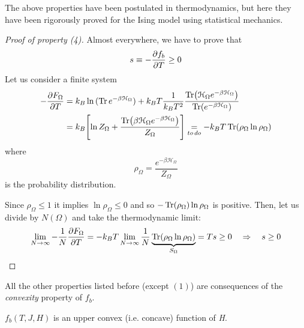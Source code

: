 \documentclass[../main/main.tex]{subfiles}
\begin{document}
\begin{remark}
The above properties have been postulated in thermodynamics, but here they have been rigorously proved for the Ising model using statistical mechanics.
\end{remark}
\begin{proof} [Proof of property (4)]
  Almost everywhere, we have to prove that
  \begin{equation*}
    s \equiv - \pdv{f_b}{T} \ge 0
  \end{equation*}
  Let us consider a finite system
  \begin{equation*}
  \begin{split}
  - \pdv{F_ \Omega }{T}   &= k_B \ln{(\Tr e^{- \beta \mathcal{H}_ \Omega }  )} + k_B T \frac{1}{k_B T^2} \frac{\Tr(\mathcal{H}_ \Omega  e^{-\beta \mathcal{H}_ \Omega } ) }{\Tr(e^{- \beta \mathcal{H}_ \Omega } ) } \\
  &= k_B \qty[\ln{Z_\Omega} + \frac{\Tr(\beta \mathcal{H}_ \Omega e^{-\beta \mathcal{H}_ \Omega
  } ) }{Z_ \Omega } ] \underset{to\, do}{=}   - k_B T \Tr(\rho _ \Omega  \ln{\rho _ \Omega } )
  \end{split}
  \end{equation*}
  where
  \begin{equation*}
    \rho _ \Omega  = \frac{e^{-\beta \mathcal{H}_ \Omega } }{Z_ \Omega  }
  \end{equation*}
  is the probability distribution.

  Since \( \rho _ \Omega \le 1 \) it implies \( \ln{\rho _ \Omega } \le 0  \) and so \( - \Tr(\rho _ \Omega ) \ln{\rho _ \Omega }   \) is positive. Then, let us divide by \( N (\Omega ) \) and take the thermodynamic limit:
  \begin{equation*}
  \lim_{N \rightarrow \infty } - \frac{1}{N} \pdv{F_ \Omega }{T}   = - k_B T  \lim_{N \rightarrow \infty }  \frac{1}{N}  \underbrace{\Tr(\rho _ \Omega  \ln{\rho _ \Omega })}_{S _ \Omega }  = T s \ge 0  \quad \Rightarrow \quad s \ge 0
  \end{equation*}
\end{proof}

All the other properties listed before (except \( (1) \)) are consequences of the \emph{convexity} property of \( f_b \).

  \begin{theorem}{}{}
  \( f_b  (T,J,H)\) is an upper convex (i.e. concave) function of \emph{H}.
  \end{theorem}
\end{document}
